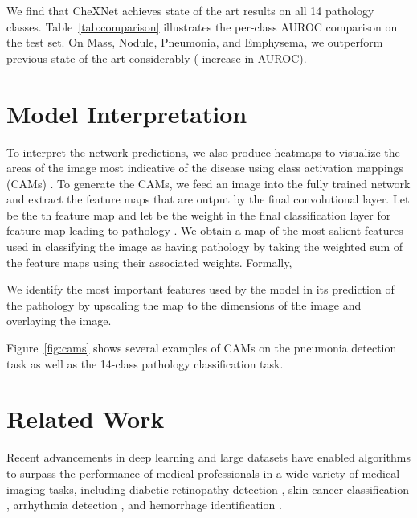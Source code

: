 \documentclass{article}
\begin{document}
We find that CheXNet achieves state of the art results on all 14 pathology classes. Table~\ref{tab:comparison} illustrates the per-class AUROC comparison on the test set. On Mass, Nodule, Pneumonia, and Emphysema, we outperform previous state of the art considerably ( increase in AUROC).




 
\section{Model Interpretation}

To interpret the network predictions, we also produce heatmaps to visualize the areas of the image most indicative of the disease using class activation mappings (CAMs) \cite{Zhou2016}. To generate the CAMs, we feed an image into the fully trained network and extract the feature maps that are output by the final convolutional layer. Let  be the th feature map and let  be the weight in the final classification layer for feature map  leading to pathology . We obtain a map  of the most salient features used in classifying the image as having pathology  by taking the weighted sum of the feature maps using their associated weights. Formally,






We identify the most important features used by the model in its prediction of the pathology  by upscaling the map  to the dimensions of the image and overlaying the image.

Figure~\ref{fig:cams} shows several examples of CAMs on the pneumonia detection task as well as the 14-class pathology classification task.  
\section{Related Work}
Recent advancements in deep learning and large datasets have enabled algorithms to surpass the performance of medical professionals in a wide variety of medical imaging tasks, including diabetic retinopathy detection \cite{Gulshan2016}, skin cancer classification \cite{Esteva2017}, arrhythmia detection \citep{Rajpurkar2017}, and hemorrhage identification \cite{Grewal2017}.
\end{document}
